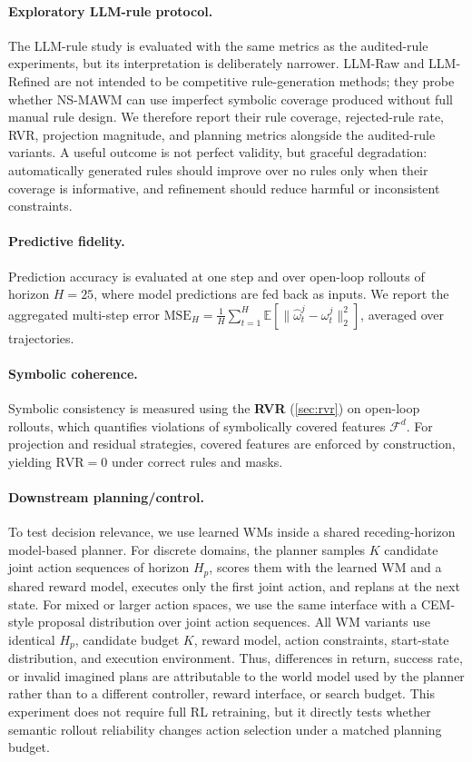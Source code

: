 \documentclass{article}
\theoremstyle{plain}
\theoremstyle{definition}
\theoremstyle{remark}
\begin{document}
\paragraph{Exploratory LLM-rule protocol.}
The LLM-rule study is evaluated with the same metrics as the audited-rule experiments, but its interpretation is deliberately narrower. LLM-Raw and LLM-Refined are not intended to be competitive rule-generation methods; they probe whether NS-MAWM can use imperfect symbolic coverage produced without full manual rule design. We therefore report their rule coverage, rejected-rule rate, RVR, projection magnitude, and planning metrics alongside the audited-rule variants. A useful outcome is not perfect validity, but graceful degradation: automatically generated rules should improve over no rules only when their coverage is informative, and refinement should reduce harmful or inconsistent constraints.

\paragraph{Predictive fidelity.}
Prediction accuracy is evaluated at one step and over open-loop rollouts
of horizon $H=25$, where model predictions are fed back as inputs.
We report the aggregated multi-step error
$
  \text{MSE}_H =
  \frac{1}{H}
  \sum_{t=1}^{H}
  \mathbb{E}\!\left[
    \|\hat{\omega}^j_t - \omega^j_t\|_2^2
    \right]
$,
averaged over trajectories.

\paragraph{Symbolic coherence.}
Symbolic consistency is measured using the
\textbf{RVR} (\autoref{sec:rvr})
on open-loop rollouts, which quantifies violations of symbolically covered features
$\mathcal{F}^d$.
For projection and residual strategies, covered features are enforced
by construction, yielding $\mathrm{RVR}=0$ under correct rules and masks.

\paragraph{Downstream planning/control.}
To test decision relevance, we use learned WMs inside a shared receding-horizon model-based planner. For discrete domains, the planner samples $K$ candidate joint action sequences of horizon $H_p$, scores them with the learned WM and a shared reward model, executes only the first joint action, and replans at the next state. For mixed or larger action spaces, we use the same interface with a CEM-style proposal distribution over joint action sequences. All WM variants use identical $H_p$, candidate budget $K$, reward model, action constraints, start-state distribution, and execution environment. Thus, differences in return, success rate, or invalid imagined plans are attributable to the world model used by the planner rather than to a different controller, reward interface, or search budget. This experiment does not require full RL retraining, but it directly tests whether semantic rollout reliability changes action selection under a matched planning budget.
\end{document}
